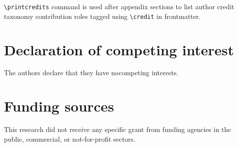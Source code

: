 \documentclass[a4paper,fleqn]{cas-dc}
\begin{document}




\verb+\printcredits+ command is used after appendix sections to list 
author credit taxonomy contribution roles tagged using \verb+\credit+ 
in frontmatter.
\printcredits
\section*{Declaration of competing interest}
The authors declare that they have nocompeting interests.
\section*{Funding sources}
This research did not receive any specific grant from funding agencies in the public, commercial, or not-for-profit sectors.
\end{document}
